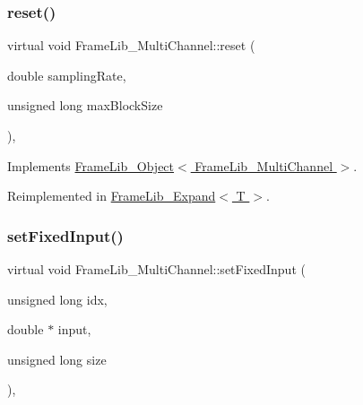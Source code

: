 \mbox{\label{class_frame_lib___multi_channel_af27f3dca507c48459452be825b4c0c72}} 
\subsubsection{\texorpdfstring{reset()}{reset()}}
{\footnotesize\ttfamily virtual void Frame\+Lib\+\_\+\+Multi\+Channel\+::reset (\begin{DoxyParamCaption}\item[{double}]{sampling\+Rate,  }\item[{unsigned long}]{max\+Block\+Size }\end{DoxyParamCaption})\hspace{0.3cm}{\ttfamily [inline]}, {\ttfamily [virtual]}}



Implements \hyperlink{class_frame_lib___object_aeb02311ab422dd569aeb982e31a66893}{Frame\+Lib\+\_\+\+Object$<$ Frame\+Lib\+\_\+\+Multi\+Channel $>$}.



Reimplemented in \hyperlink{class_frame_lib___expand_a579f16ec32e05ff84ee766038012fc3f}{Frame\+Lib\+\_\+\+Expand$<$ T $>$}.

\mbox{\label{class_frame_lib___multi_channel_a2bbd1050ff53556bf671282312857301}} 
\subsubsection{\texorpdfstring{set\+Fixed\+Input()}{setFixedInput()}}
{\footnotesize\ttfamily virtual void Frame\+Lib\+\_\+\+Multi\+Channel\+::set\+Fixed\+Input (\begin{DoxyParamCaption}\item[{unsigned long}]{idx,  }\item[{double $\ast$}]{input,  }\item[{unsigned long}]{size }\end{DoxyParamCaption})\hspace{0.3cm}{\ttfamily [inline]}, {\ttfamily [virtual]}}



